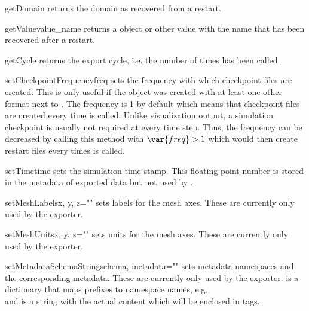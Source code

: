 \begin{methoddesc}[DataManager]{getDomain}{}
    returns the domain as recovered from a restart.
\end{methoddesc}

\begin{methoddesc}[DataManager]{getValue}{value_name}
    returns a \Data object or other value with the name  that
    has been recovered after a restart.
\end{methoddesc}

\begin{methoddesc}[DataManager]{getCycle}{}
    returns the export cycle, i.e. the number of times  has been
    called.
\end{methoddesc}

\begin{methoddesc}[DataManager]{setCheckpointFrequency}{freq}
    sets the frequency with which checkpoint files are created. This is only
    useful if the  object was created with at least one other
    format next to . The frequency is 1 by default which means
    that checkpoint files are created every time  is called.
    Unlike visualization output, a simulation checkpoint is usually not
    required at every time step. Thus, the frequency can be decreased by
    calling this method with $\var{freq}>1$ which would then create restart
    files every  times  is called.
\end{methoddesc}

\begin{methoddesc}[DataManager]{setTime}{time}
    sets the simulation time stamp. This floating point number is stored in
    the metadata of exported data but not used by .
\end{methoddesc}

\begin{methoddesc}[DataManager]{setMeshLabels}{x, y, z=""}
    sets labels for the mesh axes. These are currently only used by the \SILO
    exporter.
\end{methoddesc}

\begin{methoddesc}[DataManager]{setMeshUnits}{x, y, z=""}
    sets units for the mesh axes. These are currently only used by the \SILO
    exporter.
\end{methoddesc}

\begin{methoddesc}[DataManager]{setMetadataSchemaString}{schema, metadata=""}
    sets metadata namespaces and the corresponding metadata. These are
    currently only used by the \VTK exporter.
     is a dictionary that maps prefixes to namespace names, e.g.\\
     and  is a
    string with the actual content which will be enclosed in 
    tags.
\end{methoddesc}

